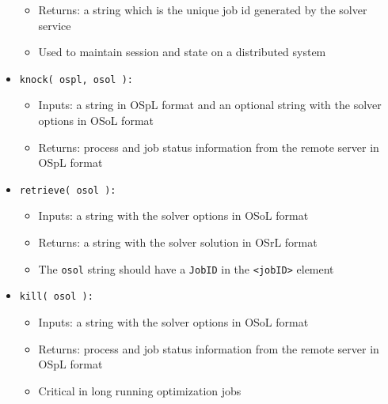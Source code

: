 \begin{itemize}
\begin{itemize}
\item Returns: a string which is the unique job id generated by the solver service

\item Used to maintain session and state on a distributed system
\end{itemize}



\item {\tt knock( ospl, osol ):}

\begin{itemize}

\item Inputs: a string in OSpL format and an optional string with the solver options in OSoL format

\item Returns: process and job status information from the remote server in OSpL format

\end{itemize}


\item {\tt retrieve( osol ):}

\begin{itemize}

\item Inputs: a string with the solver options  in OSoL format

\item Returns: a string with the solver solution in OSrL format

\item The {\tt osol} string should have a {\tt JobID} in the {\tt <jobID>} element

\end{itemize}


\item {\tt kill( osol ):}

\begin{itemize}

\item Inputs: a string with the solver options  in OSoL format

\item Returns: process and job status information from the remote server in OSpL format

\item Critical in long running optimization jobs

\end{itemize}

\end{itemize}


